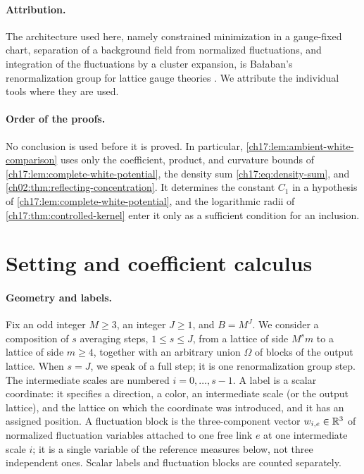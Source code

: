 \paragraph{Attribution.}
The architecture used here, namely constrained minimization in a gauge-fixed chart, separation of a background field from normalized fluctuations, and integration of the fluctuations by a cluster expansion, is Ba\l aban's renormalization group for lattice gauge theories \cite{Balaban1988RGII,Balaban1988Convergent}. We attribute the individual tools where they are used.

\paragraph{Order of the proofs.}
No conclusion is used before it is proved. In particular, \cref{ch17:lem:ambient-white-comparison} uses only the coefficient, product, and curvature bounds of \cref{ch17:lem:complete-white-potential}, the density sum \eqref{ch17:eq:density-sum}, and \cref{ch02:thm:reflecting-concentration}. It determines the constant $C_1$ in a hypothesis of \cref{ch17:lem:complete-white-potential}, and the logarithmic radii of \cref{ch17:thm:controlled-kernel} enter it only as a sufficient condition for an inclusion.

\section{Setting and coefficient calculus}\label{ch17:sec:setting}

\paragraph{Geometry and labels.}
Fix an odd integer $M\ge3$, an integer $J\ge1$, and $B=M^J$. We consider a composition of $s$ averaging steps, $1\le s\le J$, from a lattice of side $M^sm$ to a lattice of side $m\ge4$, together with an arbitrary union $\Omega$ of blocks of the output lattice. When $s=J$, we speak of a full step; it is one renormalization group step. The intermediate scales are numbered $i=0,\ldots,s-1$. A label is a scalar coordinate: it specifies a direction, a color, an intermediate scale (or the output lattice), and the lattice on which the coordinate was introduced, and it has an assigned position. A fluctuation block is the three-component vector $w_{i,e}\in\mathbb R^3$ of normalized fluctuation variables attached to one free link $e$ at one intermediate scale $i$; it is a single variable of the reference measures below, not three independent ones. Scalar labels and fluctuation blocks are counted separately.

